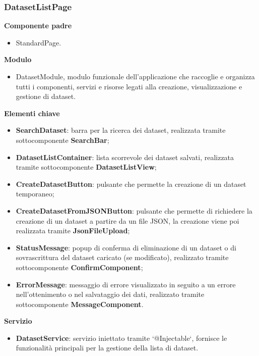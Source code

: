\subsubsection{DatasetListPage}
\textbf{Componente padre}
\begin{itemize}
    \item StandardPage.
\end{itemize}
\textbf{Modulo}
\begin{itemize}
    \item DatasetModule, modulo funzionale dell'applicazione che raccoglie e organizza tutti i componenti, servizi e risorse legati alla creazione, visualizzazione e gestione di dataset.
\end{itemize}
\textbf{Elementi chiave}
\begin{itemize}
    \item \textbf{SearchDataset}: barra per la ricerca dei dataset, realizzata tramite sottocomponente \textbf{SearchBar};
    \item \textbf{DatasetListContainer}: lista scorrevole dei dataset salvati, realizzata tramite sottocomponente \textbf{DatasetListView};
    \item \textbf{CreateDatasetButton}: pulsante che permette la creazione di un dataset temporaneo;
    \item \textbf{CreateDatasetFromJSONButton}: pulsante che permette di richiedere la creazione di un dataset a partire da un file JSON, la creazione viene poi realizzata tramite \textbf{JsonFileUpload};
    \item \textbf{StatusMessage}: popup di conferma di eliminazione di un dataset o di sovrascrittura del dataset caricato (se modificato), realizzato tramite sottocomponente \textbf{ConfirmComponent};
    \item \textbf{ErrorMessage}: messaggio di errore visualizzato in seguito a un errore nell'ottenimento o nel salvataggio dei dati, realizzato tramite sottocomponente \textbf{MessageComponent}.
\end{itemize}
\textbf{Servizio}
\begin{itemize}
    \item \textbf{DatasetService}: servizio iniettato tramite `@Injectable`, fornisce le funzionalità principali per la gestione della lista di dataset.
\end{itemize}

